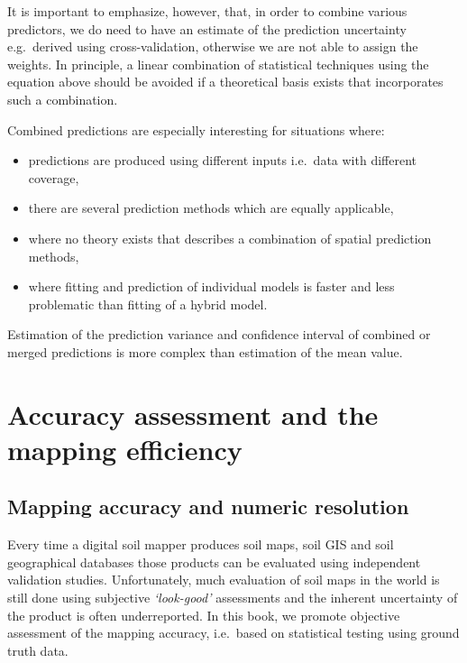 \documentclass[11pt]{krantz}
\theoremstyle{definition}
\theoremstyle{definition}
\theoremstyle{definition}
\theoremstyle{remark}
\begin{document}
It is important to emphasize, however, that, in order to combine various
predictors, we do need to have an estimate of the prediction uncertainty
e.g.~derived using cross-validation, otherwise we are not able to assign
the weights. In principle, a linear combination of statistical
techniques using the equation above should be avoided if a theoretical
basis exists that incorporates such a combination.

Combined predictions are especially interesting for situations where:

\begin{itemize}
\item
  predictions are produced using different inputs i.e.~data with
  different coverage,
\item
  there are several prediction methods which are equally applicable,
\item
  where no theory exists that describes a combination of spatial
  prediction methods,
\item
  where fitting and prediction of individual models is faster and less
  problematic than fitting of a hybrid model.
\end{itemize}

Estimation of the prediction variance and confidence interval of
combined or merged predictions is more complex than estimation of the
mean value.

\hypertarget{accuracy-assessment}{%
\section{Accuracy assessment and the mapping
efficiency}\label{accuracy-assessment}}

\hypertarget{mapping-accuracy}{%
\subsection{Mapping accuracy and numeric
resolution}\label{mapping-accuracy}}

Every time a digital soil mapper produces soil maps, soil GIS and soil
geographical databases those products can be evaluated using independent
validation studies. Unfortunately, much evaluation of soil maps in the
world is still done using subjective \emph{`look-good'} assessments and
the inherent uncertainty of the product is often underreported. In this
book, we promote objective assessment of the mapping accuracy,
i.e.~based on statistical testing using ground truth data.
\end{document}
